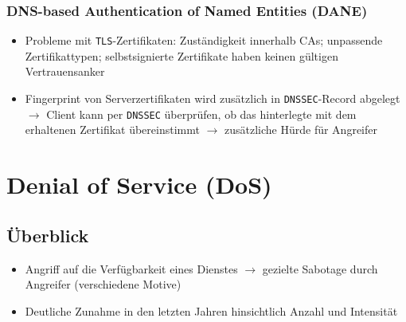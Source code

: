 \subsubsection{DNS-based Authentication of Named Entities (DANE)}
\begin{itemize}
	\item Probleme mit \texttt{TLS}-Zertifikaten: Zuständigkeit innerhalb CAs; unpassende Zertifikattypen; selbstsignierte Zertifikate haben keinen gültigen Vertrauensanker
	\item Fingerprint von Serverzertifikaten wird zusätzlich in \texttt{DNSSEC}-Record abgelegt \(\rightarrow\) Client kann per \texttt{DNSSEC} überprüfen, ob das hinterlegte mit dem erhaltenen Zertifikat übereinstimmt \(\rightarrow\) zusätzliche Hürde für Angreifer
\end{itemize}



\section{Denial of Service (DoS)}

\subsection{Überblick}
\begin{itemize}
	\item Angriff auf die Verfügbarkeit eines Dienstes \(\rightarrow\) gezielte Sabotage durch Angreifer (verschiedene Motive)
	\item Deutliche Zunahme in den letzten Jahren hinsichtlich Anzahl und Intensität
\end{itemize}



